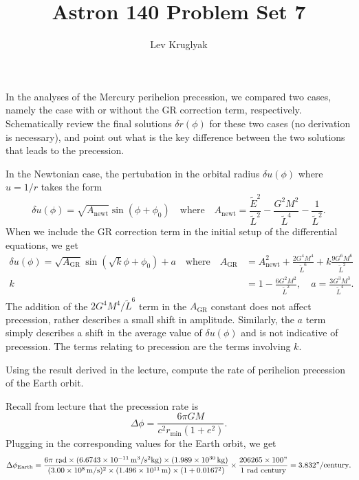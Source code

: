\documentclass{../../templates/lkx_pset}
\title{Astron 140 Problem Set 7}
\author{Lev Kruglyak}
\begin{document}
\maketitle

\begin{problem}{1}
In the analyses of the Mercury perihelion precession, we compared two cases, namely the case with or without the GR correction term, respectively. Schematically review the final solutions $\delta r(\phi)$ for these two cases (no derivation is necessary), and point out what is the key difference between the two solutions that leads to the precession.
\end{problem}

\begin{solution}
	In the Newtonian case, the pertubation in the orbital radius $\delta u(\phi)$ where $u=1/r$ takes the form
	\[
		\delta u(\phi) = \sqrt{A_{\textrm{newt}}} \sin(\phi + \phi_0)\quad\textrm{where}\quad A_{\textrm{newt}} = \frac{\widetilde{E}^2}{\widetilde{L}^2} - \frac{G^2M^2}{\widetilde{L}^4} - \frac{1}{\widetilde{L}^2}.
	\]
	When we include the GR correction term in the initial setup of the differential equations, we get
	\[
		\begin{aligned}
			\delta u(\phi) = \sqrt{A_{\textrm{GR}}} \sin(\sqrt{k}\phi + \phi_0) + a\quad\textrm{where}\quad A_{\textrm{GR}} &= A_{\textrm{newt}}^2 + \frac{2G^4M^4}{\widetilde{L}^6} + k\frac{9G^6M^6}{\widetilde{L}^2}\\
			k &= 1-\frac{6G^2M^2}{\widetilde{L}^2},\quad a = \frac{3G^3M^3}{\widetilde{L}^4}.
		\end{aligned}
	\]
	The addition of the $2G^4M^4/\widetilde{L}^6$ term in the $A_{\textrm{GR}}$ constant does not affect precession, rather describes a small shift in amplitude. Similarly, the $a$ term simply describes a shift in the average value of $\delta u(\phi)$ and is not indicative of precession. The terms relating to precession are the terms involving $k$.
\end{solution}


\begin{problem}{2}
Using the result derived in the lecture, compute the rate of perihelion precession of the Earth orbit.
\end{problem}

\begin{solution}
  Recall from lecture that the precession rate is
  \[\Delta \phi = \frac{6\pi G M}{c^2 r_{\textrm{min}}(1+e^2)}.\]
  Plugging in the corresponding values for the Earth orbit, we get
  \[
    \Delta \phi_{\textrm{Earth}} = \frac{6\pi\textrm{ rad} \times (\Gsi{6.6743e-11})\times (\kgsi{1.989e30})}{(\mpssi{3.00e8})^2\times (\msi{1.496e11})\times (1+0.0167^2)}\times\frac{206265\times 100 "}{1\textrm{ rad}\textrm{ century}} = 3.832" / \textrm{century}.
  \]
\end{solution}
\end{document}
